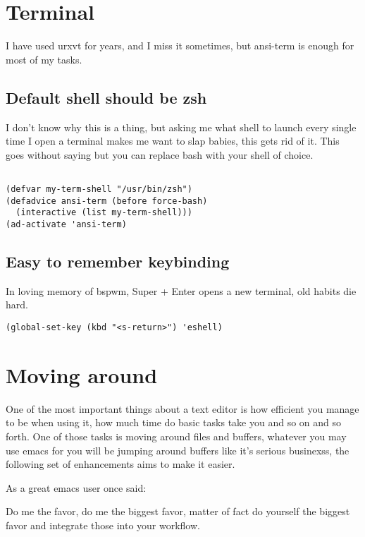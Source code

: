 \documentclass[12pt]{article}
\begin{document}
\section{Terminal}
\label{sec:orgcf158e7}

I have used urxvt for years, and I miss it sometimes, but ansi-term is enough for most of my tasks.
\subsection{Default shell should be zsh}
\label{sec:org62a25f5}

I don’t know why this is a thing, but asking me what shell to launch every single time I open a terminal makes me want to slap babies, this gets rid of it. This goes without saying but you can replace bash with your shell of choice.
\begin{verbatim}

(defvar my-term-shell "/usr/bin/zsh")
(defadvice ansi-term (before force-bash)
  (interactive (list my-term-shell)))
(ad-activate 'ansi-term)
\end{verbatim}

\subsection{Easy to remember keybinding}
\label{sec:org27597e0}

In loving memory of bspwm, Super + Enter opens a new terminal, old habits die hard.
\begin{verbatim}
(global-set-key (kbd "<s-return>") 'eshell)
\end{verbatim}

\section{Moving around}
\label{sec:orgd92de63}

One of the most important things about a text editor is how efficient
you manage to be when using it, how much time do basic tasks take you
and so on and so forth. One of those tasks is moving around files and
buffers, whatever you may use emacs for you will be jumping around
buffers like it’s serious businexss, the following set of enhancements
aims to make it easier.

As a great emacs user once said:

Do me the favor, do me the biggest favor, matter of fact do
yourself the biggest favor and integrate those into your workflow.
\end{document}
